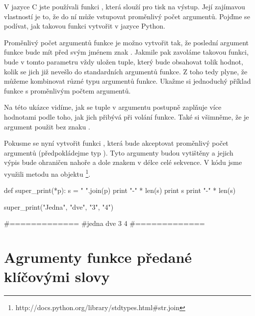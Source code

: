 V jazyce C jste používali funkci , která slouží pro tisk na výstup. Její zajímavou vlastností
je to, že do ní může vstupovat proměnlivý počet argumentů. Pojďme se podívat, jak takovou funkci
vytvořit v jazyce Python.

Proměnlivý počet argumentů funkce je možno vytvořit tak, že poslední argument funkce bude mít před
svým jménem znak \kod{*}. Jakmile pak zavoláme takovou funkci, bude v tomto parametru vždy uložen
tuple, který bude obsahovat tolik hodnot, kolik se jich již nevešlo do standardních argumentů funkce.
Z toho tedy plyne, že můžeme kombinovat různé typu argumentů funkce. Ukažme si jednoduchý příklad
funkce s proměnlivým počtem argumentů.


Na této ukázce vidíme, jak se tuple v argumentu  postupně zaplňuje více hodnotami podle toho,
jak jich přibývá při volání funkce. Také si všimněme, že je argument použit bez znaku \kod{*}.

Pokusme se nyní vytvořit funkci , která bude akceptovat proměnlivý počet argumentů
(předpokládejme typ ). Tyto argumenty budou vytištěny a jejich výpis bude ohraničen
nahoře a dole znakem \kod{=} v délce celé sekvence. V kódu jsme využili metodu 
na objektu \footnote{http://docs.python.org/library/stdtypes.html\#str.join}.

\begin{python}
def super_print(*p):
  s = " ".join(p)
  print "-" * len(s)
  print s
  print "-" * len(s)

super_print("Jedna", "dve", "3", "4")

#=============
#jedna dve 3 4
#=============
\end{python}

\section{Agrumenty funkce předané klíčovými slovy}

